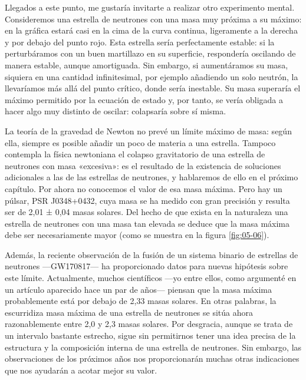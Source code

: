Llegados a este punto, me gustaría invitarte a realizar otro experimento mental. Consideremos una estrella de neutrones con una masa muy próxima a su máximo: en la gráfica estará casi en la cima de la curva continua, ligeramente a la derecha y por debajo del punto rojo. Esta estrella sería perfectamente estable: si la perturbáramos con un buen martillazo en su superficie, respondería oscilando de manera estable, aunque amortiguada. Sin embargo, si aumentáramos su masa, siquiera en una cantidad infinitesimal, por ejemplo añadiendo un solo neutrón, la llevaríamos más allá del punto crítico, donde sería inestable. Su masa superaría el máximo permitido por la ecuación de estado y, por tanto, se vería obligada a hacer algo muy distinto de oscilar: colapsaría sobre sí misma.

La teoría de la gravedad de Newton no prevé un límite máximo de masa: según ella, siempre es posible añadir un poco de materia a una estrella. Tampoco contempla la física newtoniana el colapso gravitatorio de una estrella de neutrones con masa «excesiva»: es el resultado de la existencia de soluciones adicionales a las de las estrellas de neutrones, y hablaremos de ello en el próximo capítulo. Por ahora no conocemos el valor de esa masa máxima. Pero hay un púlsar, PSR J0348+0432, cuya masa se ha medido con gran precisión y resulta ser de 2,01 ± 0,04 masas solares. Del hecho de que exista en la naturaleza una estrella de neutrones con una masa tan elevada se deduce que la masa máxima debe ser necesariamente mayor (como se muestra en la figura \ref{fig:05-06}).

Además, la reciente observación de la fusión de un sistema binario de estrellas de neutrones ---GW170817--- ha proporcionado datos para nuevas hipótesis sobre este límite. Actualmente, muchos científicos ---yo entre ellos, como argumenté en un artículo aparecido hace un par de años--- piensan que la masa máxima probablemente está por debajo de 2,33 masas solares. En otras palabras, la escurridiza masa máxima de una estrella de neutrones se sitúa ahora razonablemente entre 2,0 y 2,3 masas solares. Por desgracia, aunque se trata de un intervalo bastante estrecho, sigue sin permitirnos tener una idea precisa de la estructura y la composición interna de una estrella de neutrones. Sin embargo, las observaciones de los próximos años nos proporcionarán muchas otras indicaciones que nos ayudarán a acotar mejor su valor.

